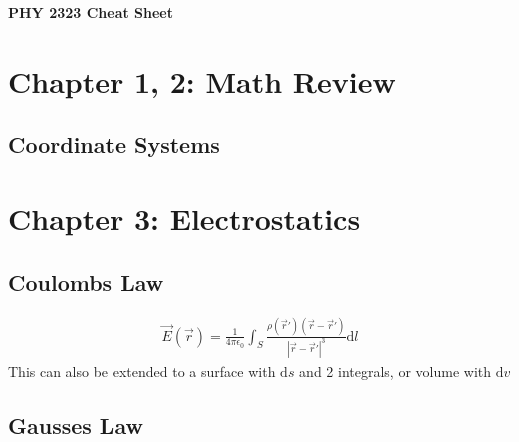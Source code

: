 \documentclass[12pt,letterpaper]{article} \usepackage{amsmath} \usepackage{graphicx} \usepackage[margin=1in]{geometry} \usepackage{longtable}  \usepackage{amssymb}
\begin{document}
	
	\begin{center}
		\Large\textbf{PHY 2323 Cheat Sheet} \\
		\vspace{0.5em}
	\end{center}

	\section{Chapter 1, 2: Math Review}
	
	\subsection{Coordinate Systems}
	
	\section{Chapter 3: Electrostatics}
	
	\subsection{Coulombs Law}
	\begin{align*}
		\vec E (\vec r) = \frac{1}{4\pi \epsilon_0} \int_S \frac{\rho(\vec r\prime)(\vec r - \vec r\prime)}{|\vec r - \vec r\prime | ^3}\mathrm d l
	\end{align*}
	This can also be extended to a surface with $\mathrm ds$ and 2 integrals, or volume with $\mathrm dv$
	
	\subsection{Gausses Law}
	
	
	
\end{document}
